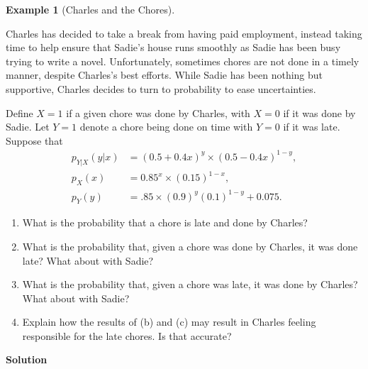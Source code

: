 \documentclass[
  letterpaper,
  DIV=11,
  numbers=noendperiod]{scrreprt}
\providecommand{\tightlist}{%
  \setlength{\itemsep}{0pt}\setlength{\parskip}{0pt}}\usepackage{longtable,booktabs,array}
\theoremstyle{definition}
\theoremstyle{definition}
\theoremstyle{definition}
\newtheorem{example}{Example}[chapter]
\theoremstyle{remark}
\begin{document}
\begin{example}[Charles and the
Chores]\protect\hypertarget{exm-pmg-multiplication-and-bayes}{}\label{exm-pmg-multiplication-and-bayes}

Charles has decided to take a break from having paid employment, instead
taking time to help ensure that Sadie's house runs smoothly as Sadie has
been busy trying to write a novel. Unfortunately, sometimes chores are
not done in a timely manner, despite Charles's best efforts. While Sadie
has been nothing but supportive, Charles decides to turn to probability
to ease uncertainties.

Define \(X=1\) if a given chore was done by Charles, with \(X=0\) if it
was done by Sadie. Let \(Y=1\) denote a chore being done on time with
\(Y = 0\) if it was late. Suppose that \begin{align*}
p_{Y|X}(y|x) &= (0.5 + 0.4x)^{y}\times(0.5 - 0.4x)^{1-y},\\
p_X(x) &= 0.85^{x}\times(0.15)^{1-x},\\
p_Y(y) &= .85\times(0.9)^y(0.1)^{1-y} + 0.075.
\end{align*}

\begin{enumerate}
\def\labelenumi{\alph{enumi}.}
\tightlist
\item
  What is the probability that a chore is late and done by Charles?
\item
  What is the probability that, given a chore was done by Charles, it
  was done late? What about with Sadie?
\item
  What is the probability that, given a chore was late, it was done by
  Charles? What about with Sadie?
\item
  Explain how the results of (b) and (c) may result in Charles feeling
  responsible for the late chores. Is that accurate?
\end{enumerate}

\begin{tcolorbox}[enhanced jigsaw, colback=white, breakable, rightrule=.15mm, leftrule=.75mm, toprule=.15mm, left=2mm, arc=.35mm, opacityback=0, bottomrule=.15mm]

\vspace{-3mm}\textbf{Solution}\vspace{3mm}


\end{tcolorbox}
\end{example}
\end{document}
